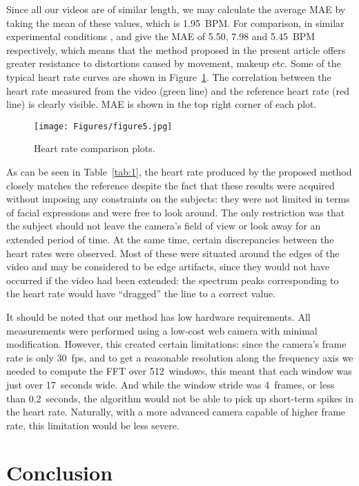 Since all our videos are of similar length, we may calculate the average MAE by taking the mean of these values, which is 1.95~BPM. For comparison, in similar experimental conditions \cite{lernia}, \cite{haugg} and \cite{artemyev} give the MAE of 5.50, 7.98 and 5.45~BPM respectively, which means that the method proposed in the present article offers greater resistance to distortions caused by movement, makeup etc. Some of the typical heart rate curves are shown in Figure~\ref{fig:5}. The correlation between the heart rate measured from the video (green line) and the reference heart rate (red line) is clearly visible. MAE is shown in the top right corner of each plot.

\begin{figure}[htbp]
    \centering
    \texttt{[image: Figures/figure5.jpg]}
    \caption{Heart rate comparison plots.}
    \label{fig:5}
\end{figure}

As can be seen in Table~\ref{tab:1}, the heart rate produced by the proposed method closely matches the reference despite the fact that these results were acquired without imposing any constraints on the subjects: they were not limited in terms of facial expressions and were free to look around. The only restriction was that the subject should not leave the camera’s field of view or look away for an extended period of time. At the same time, certain discrepancies between the heart rates were observed. Most of these were situated around the edges of the video and may be considered to be edge artifacts, since they would not have occurred if the video had been extended: the spectrum peaks corresponding to the heart rate would have “dragged” the line to a correct value.

It should be noted that our method has low hardware requirements. All measurements were performed using a low-cost web camera with minimal modification. However, this created certain limitations: since the camera’s frame rate is only 30~fps, and to get a reasonable resolution along the frequency axis we needed to compute the FFT over 512~windows, this meant that each window was just over 17~seconds wide. And while the window stride was 4~frames, or less than 0.2~seconds, the algorithm would not be able to pick up short-term spikes in the heart rate. Naturally, with a more advanced camera capable of higher frame rate, this limitation would be less severe.

\section{Conclusion}\label{conclusion}

